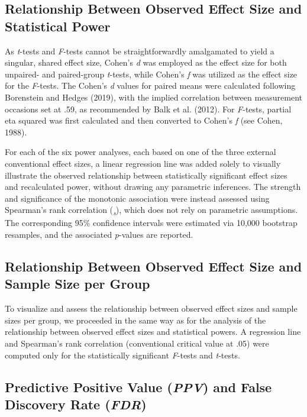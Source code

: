 \documentclass[authordate, meta]{jote-new-article}
\begin{document}
	\subsection{Relationship Between Observed Effect Size and Statistical Power}



	As \emph{t}-tests and \emph{F}-tests cannot be straightforwardly amalgamated to yield a singular, shared effect size, Cohen's \emph{d} was employed as the effect size for both unpaired- and paired-group \emph{t}-tests, while Cohen's \emph{f} was utilized as the effect size for the \emph{F}-tests. The Cohen's \emph{d} values for paired means were calculated following Borenstein and Hedges (2019), with the implied correlation between measurement occasions set at .59, as recommended by Balk et al. (2012). For \emph{F}-tests, partial eta squared was first calculated and then converted to Cohen's \emph{f} (see Cohen, 1988).



	For each of the six power analyses, each based on one of the three external conventional effect sizes, a linear regression line was added solely to visually illustrate the observed relationship between statistically significant effect sizes and recalculated power, without drawing any parametric inferences. The strength and significance of the monotonic association were instead assessed using Spearman's rank correlation (\rho\textsubscript{\emph{s}}), which does not rely on parametric assumptions. The corresponding 95\% confidence intervals were estimated via 10,000 bootstrap resamples, and the associated \emph{p}-values are reported.



	\subsection{Relationship Between Observed Effect Size and Sample Size per Group}



	To visualize and assess the relationship between observed effect sizes and sample sizes per group, we proceeded in the same way as for the analysis of the relationship between observed effect sizes and statistical powers. A regression line and Spearman's rank correlation (conventional critical value at .05) were computed only for the statistically significant \emph{F}-tests and \emph{t}-tests.



	\subsection{Predictive Positive Value (\emph{PPV}) and False Discovery Rate (\emph{FDR})}
\end{document}
